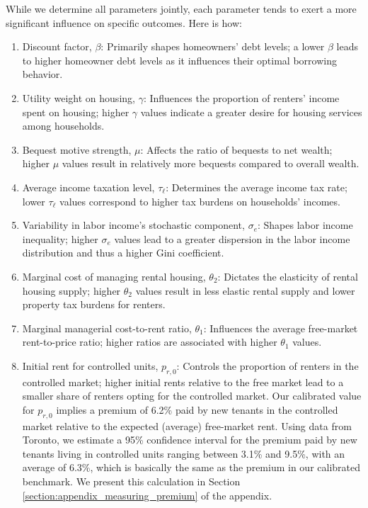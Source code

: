 \documentclass[parskip=full]{article}
\begin{document}
While we determine all parameters jointly, each parameter tends to exert a more significant influence on specific outcomes. Here is how:
\begin{enumerate}
    \item Discount factor, $\beta$: Primarily shapes homeowners' debt levels; a lower $\beta$ leads to higher homeowner debt levels as it influences their optimal borrowing behavior.
    \item Utility weight on housing, $\gamma$: Influences the proportion of renters' income spent on housing; higher $\gamma$ values indicate a greater desire for housing services among households.
    \item Bequest motive strength, $\mu$: Affects the ratio of bequests to net wealth; higher $\mu$ values result in relatively more bequests compared to overall wealth.
    \item Average income taxation level, $\tau_{\ell}$: Determines the average income tax rate; lower $\tau_{\ell}$ values correspond to higher tax burdens on households' incomes.
    \item Variability in labor income's stochastic component, $\sigma_{e}$: Shapes labor income inequality; higher $\sigma_{e}$ values lead to a greater dispersion in the labor income distribution and thus a higher Gini coefficient.
    \item Marginal cost of managing rental housing, $\theta_{2}$: Dictates the elasticity of rental housing supply; higher $\theta_{2}$ values result in less elastic rental supply and lower property tax burdens for renters.
    \item Marginal managerial cost-to-rent ratio, $\theta_{1}$: Influences the average free-market rent-to-price ratio; higher ratios are associated with higher $\theta_{1}$ values.
    \item Initial rent for controlled units, $p_{r,0}$: Controls the proportion of renters in the controlled market; higher initial rents relative to the free market lead to a smaller share of renters opting for the controlled market. Our calibrated value for $p_{r,0}$ implies a premium of 6.2\% paid by new tenants in the controlled market relative to the expected (average) free-market rent. Using data from Toronto, we estimate a 95\% confidence interval for the premium paid by new tenants living in controlled units ranging between 3.1\% and 9.5\%, with an average of 6.3\%, which is basically the same as the premium in our calibrated benchmark. We present this calculation in Section \ref{section:appendix_measuring_premium} of the appendix.

\end{enumerate}
\end{document}
